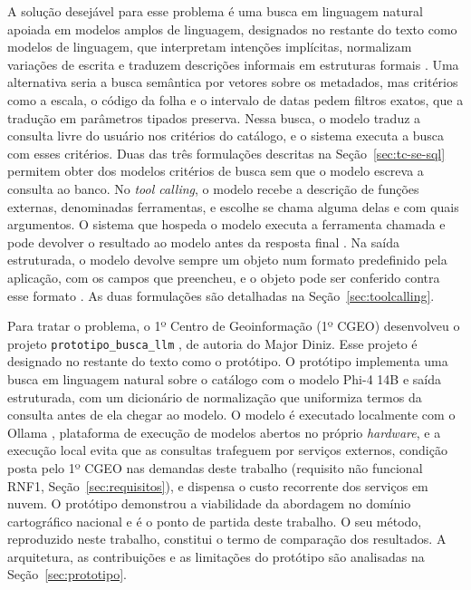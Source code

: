 A solução desejável para esse problema é uma busca em linguagem natural apoiada em modelos amplos de linguagem, designados no restante do texto como modelos de linguagem, que interpretam intenções implícitas, normalizam variações de escrita e traduzem descrições informais em estruturas formais \cite{brown2020gpt3, wei2022emergent}. Uma alternativa seria a busca semântica por vetores sobre os metadados, mas critérios como a escala, o código da folha e o intervalo de datas pedem filtros exatos, que a tradução em parâmetros tipados preserva. Nessa busca, o modelo traduz a consulta livre do usuário nos critérios do catálogo, e o sistema executa a busca com esses critérios. Duas das três formulações descritas na Seção~\ref{sec:tc-se-sql} permitem obter dos modelos critérios de busca sem que o modelo escreva a consulta ao banco. No \textit{tool calling}, o modelo recebe a descrição de funções externas, denominadas ferramentas, e escolhe se chama alguma delas e com quais argumentos. O sistema que hospeda o modelo executa a ferramenta chamada e pode devolver o resultado ao modelo antes da resposta final \cite{schick2023toolformer, qin2023toolllm}. Na saída estruturada, o modelo devolve sempre um objeto num formato predefinido pela aplicação, com os campos que preencheu, e o objeto pode ser conferido contra esse formato \cite{tam2024speak, geng2025jsonschemabench}. As duas formulações são detalhadas na Seção~\ref{sec:toolcalling}.

Para tratar o problema, o 1º Centro de Geoinformação (1º CGEO) desenvolveu o projeto \texttt{prototipo\_busca\_llm} \cite{cgeo2025prototipo}, de autoria do Major Diniz. Esse projeto é designado no restante do texto como o protótipo. O protótipo implementa uma busca em linguagem natural sobre o catálogo com o modelo Phi-4 14B \cite{abdin2024phi4} e saída estruturada, com um dicionário de normalização que uniformiza termos da consulta antes de ela chegar ao modelo. O modelo é executado localmente com o Ollama \cite{ollama2023}, plataforma de execução de modelos abertos no próprio \textit{hardware}, e a execução local evita que as consultas trafeguem por serviços externos, condição posta pelo 1º CGEO nas demandas deste trabalho (requisito não funcional RNF1, Seção~\ref{sec:requisitos}), e dispensa o custo recorrente dos serviços em nuvem. O protótipo demonstrou a viabilidade da abordagem no domínio cartográfico nacional e é o ponto de partida deste trabalho. O seu método, reproduzido neste trabalho, constitui o termo de comparação dos resultados. A arquitetura, as contribuições e as limitações do protótipo são analisadas na Seção~\ref{sec:prototipo}.

